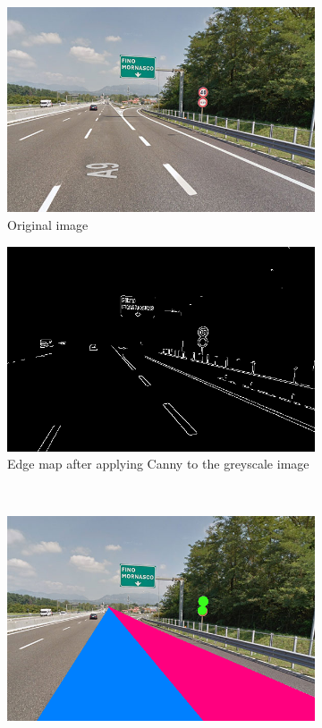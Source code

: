 \documentclass[twoside,onecolumn]{article}
\theoremstyle{definition}
\begin{document}
\begin{figure} \centering
\begin{subfigure}{0.45\textwidth}
  \includegraphics[width=\textwidth]{figs/road4.jpg}
\caption{Original image }\label{fig:r4fig}
\end{subfigure} \quad
\begin{subfigure}{0.45\textwidth}
\includegraphics[width=\textwidth]{figs/edgeMap_road4.png}
\caption{Edge map after applying Canny to the greyscale image}\label{fig:r4edges}
\end{subfigure}\\
  \begin{subfigure}{0.6\textwidth}
\includegraphics[width=\textwidth]{figs/Circles_road4.png}

\end{subfigure}
\end{figure}
\end{document}
